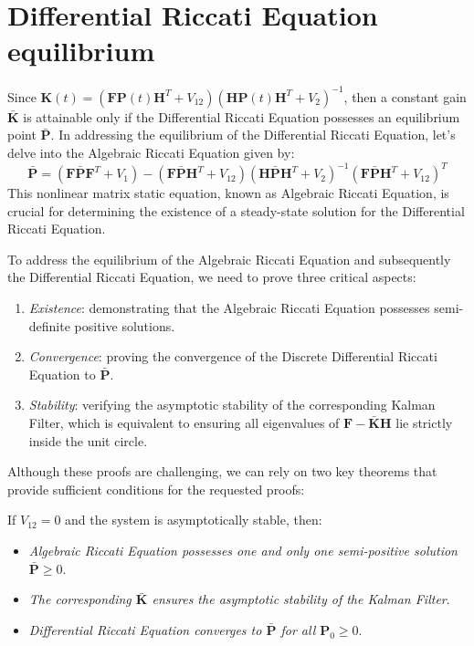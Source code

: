 \section{Differential Riccati Equation equilibrium}

Since $\mathbf{K}(t)=\left(\mathbf{FP}(t)\mathbf{H}^T+V_{12}\right)\left(\mathbf{HP}(t)\mathbf{H}^T+V_2\right)^{-1}$, then a constant gain $\bar{\mathbf{K}}$ is attainable only if the Differential Riccati Equation possesses an equilibrium point $\bar{\mathbf{P}}$.
In addressing the equilibrium of the Differential Riccati Equation, let's delve into the Algebraic Riccati Equation given by:
\[\bar{\mathbf{P}}=\left(\mathbf{F}\bar{\mathbf{P}}\mathbf{F}^T+V_1\right)-\left(\mathbf{F}\bar{\mathbf{P}}\mathbf{H}^T+V_{12}\right)\left(\mathbf{H}\bar{\mathbf{P}}\mathbf{H}^T+V_{2}\right)^{-1}\left(\mathbf{F}\bar{\mathbf{P}}\mathbf{H}^T+V_{12}\right)^T\]
This nonlinear matrix static equation, known as Algebraic Riccati Equation, is crucial for determining the existence of a steady-state solution for the Differential Riccati Equation.

To address the equilibrium of the Algebraic Riccati Equation and subsequently the Differential Riccati Equation, we need to prove three critical aspects:
\begin{enumerate}
    \item \textit{Existence}: demonstrating that the Algebraic Riccati Equation possesses semi-definite positive solutions.
    \item \textit{Convergence}: proving the convergence of the Discrete Differential Riccati Equation to $\bar{\mathbf{P}}$.
    \item \textit{Stability}: verifying the asymptotic stability of the corresponding Kalman Filter, which is equivalent to ensuring all eigenvalues of $\mathbf{F}-\bar{\mathbf{K}}\mathbf{H}$ lie strictly inside the unit circle.
\end{enumerate}
Although these proofs are challenging, we can rely on two key theorems that provide sufficient conditions for the requested proofs:
\begin{theorem}
    If $V_{12}=0$ and the system is asymptotically stable, then:
\end{theorem}  
\begin{itemize}
    \item \textit{Algebraic Riccati Equation possesses one and only one semi-positive solution $\bar{\mathbf{P}}\geq 0$}.
    \item \textit{The corresponding $\bar{\mathbf{K}}$ ensures the asymptotic stability of the Kalman Filter}. 
    \item \textit{Differential Riccati Equation converges to $\bar{\mathbf{P}}$ for all $\mathbf{P}_0\geq 0$}.
\end{itemize}

